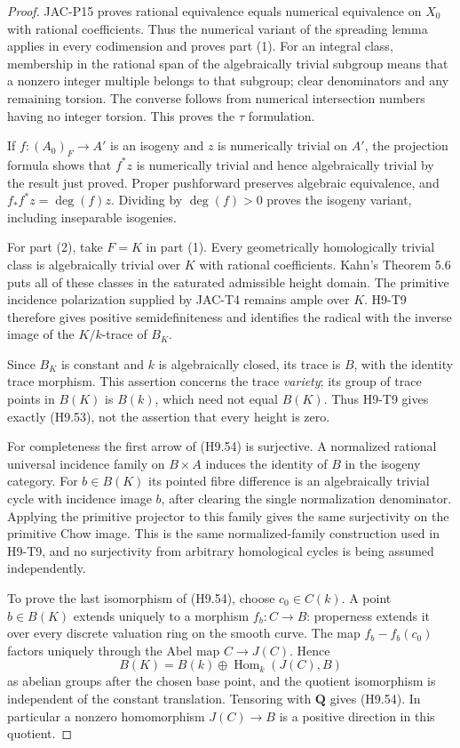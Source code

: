 \begin{proof}
JAC-P15 proves rational equivalence equals numerical equivalence on
$X_0$ with rational coefficients. Thus the numerical variant of the
spreading lemma applies in every codimension and proves part (1).
For an integral class, membership in the rational span of the
algebraically trivial subgroup means that a nonzero integer multiple
belongs to that subgroup; clear denominators and any remaining
torsion. The converse follows from numerical intersection numbers
having no integer torsion. This proves the $\tau$ formulation.

If $f:(A_0)_F\to A'$ is an isogeny and $z$ is numerically trivial
on $A'$, the projection formula shows that $f^*z$ is numerically
trivial and hence algebraically trivial by the result just proved.
Proper pushforward preserves algebraic
equivalence, and $f_*f^*z=\deg(f)z$. Dividing by $\deg(f)>0$
proves the isogeny variant, including inseparable isogenies.

For part (2), take $F=K$ in part (1). Every geometrically
homologically trivial class is algebraically trivial over $K$ with
rational coefficients. Kahn's Theorem 5.6 puts all of these classes
in the saturated admissible height domain. The primitive incidence
polarization supplied by JAC-T4 remains ample over $K$.
H9-T9 therefore gives positive semidefiniteness and identifies the
radical with the inverse image of the $K/k$-trace of $B_K$.

Since $B_K$ is constant and $k$ is algebraically closed, its trace is
$B$, with the identity trace morphism. This assertion concerns the
trace \emph{variety}; its group of trace points in $B(K)$ is
$B(k)$, which need not equal $B(K)$. Thus H9-T9 gives exactly
(H9.53), not the assertion that every height is zero.

For completeness the first arrow of (H9.54) is surjective.
A normalized rational universal incidence family on $B\times A$
induces the identity of $B$ in the isogeny category. For $b\in B(K)$
its pointed fibre difference is an algebraically trivial cycle with
incidence image $b$, after clearing the single normalization
denominator. Applying the primitive projector to this family gives
the same surjectivity on the primitive Chow image. This is the same
normalized-family construction used in H9-T9, and no surjectivity
from arbitrary homological cycles is being assumed independently.

To prove the last isomorphism of (H9.54), choose $c_0\in C(k)$.
A point $b\in B(K)$ extends uniquely to a morphism $f_b:C\to B$:
properness extends it over every discrete valuation ring on the
smooth curve. The map $f_b-f_b(c_0)$ factors uniquely through the
Abel map $C\to J(C)$. Hence
\[
 B(K)=B(k)\oplus\operatorname{Hom}_k(J(C),B)
\]
as abelian groups after the chosen base point, and the quotient
isomorphism is independent of the constant translation. Tensoring
with $\mathbf Q$ gives (H9.54). In particular a nonzero homomorphism
$J(C)\to B$ is a positive direction in this quotient.


\end{proof}
